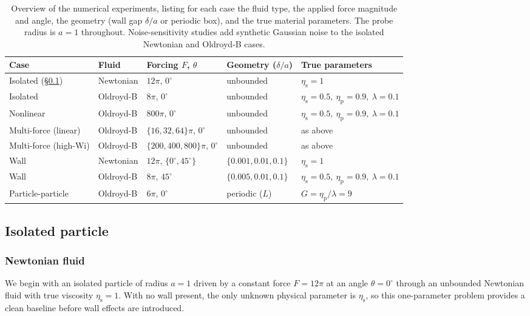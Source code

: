 \documentclass{elsarticle}
\newcommand{\wi}{\mathrm{Wi}}
\begin{document}
\begin{table}[!ht]
\centering
\small
\begin{tabular}{lllll}
\toprule
Case & Fluid & Forcing $F$, $\theta$ & Geometry ($\delta/a$) & True parameters \\
\midrule
Isolated (\S\ref{subsec:newtonian})
 & Newtonian & $12\pi$, $0^{\circ}$ & unbounded & $\eta_{\mathrm{s}}=1$ \\
Isolated
 & Oldroyd-B & $8\pi$, $0^{\circ}$ & unbounded
 & $\eta_{\mathrm{s}}=0.5,\ \eta_{\mathrm{p}}=0.9,\ \lambda=0.1$ \\
Nonlinear
 & Oldroyd-B & $800\pi$, $0^{\circ}$ & unbounded
 & $\eta_{\mathrm{s}}=0.5,\ \eta_{\mathrm{p}}=0.9,\ \lambda=0.1$ \\
Multi-force (linear)
 & Oldroyd-B & $\{16,32,64\}\pi$, $0^{\circ}$ & unbounded
 & as above \\
Multi-force (high-$\wi$)
 & Oldroyd-B & $\{200,400,800\}\pi$, $0^{\circ}$ & unbounded
 & as above \\
Wall
 & Newtonian & $12\pi$, $\{0^{\circ},45^{\circ}\}$ & $\{0.001,0.01,0.1\}$
 & $\eta_{\mathrm{s}}=1$ \\
Wall
 & Oldroyd-B & $8\pi$, $45^{\circ}$ & $\{0.005,0.01,0.1\}$
 & $\eta_{\mathrm{s}}=0.5,\ \eta_{\mathrm{p}}=0.9,\ \lambda=0.1$ \\
Particle-particle
 & Oldroyd-B & $6\pi$, $0^{\circ}$ & periodic ($L$)
 & $G=\eta_{\mathrm{p}}/\lambda=9$ \\
\bottomrule
\end{tabular}
\caption{Overview of the numerical experiments, listing for each case the
fluid type, the applied force magnitude and angle, the geometry (wall gap
$\delta/a$ or periodic box), and the true material parameters. The probe
radius is $a=1$ throughout. Noise-sensitivity studies add synthetic
Gaussian noise to the isolated Newtonian and Oldroyd-B cases.}
\label{tab:experiment_design}
\end{table}


\subsection{Isolated particle}
\label{subsec:newtonian}
\subsubsection{Newtonian fluid}

We begin with an isolated particle of radius $a=1$ driven by a constant
force $F=12\pi$ at an angle $\theta=0^\circ$ through an unbounded
Newtonian fluid with true viscosity $\eta_{\mathrm{s}}=1$. With no wall
present, the only unknown physical parameter is $\eta_{\mathrm{s}}$, so
this one-parameter problem provides a clean baseline before wall effects
are introduced.
\end{document}

